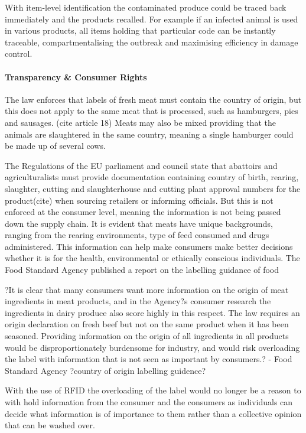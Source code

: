 \documentclass[a4paper, 11pt]{article}
\begin{document}
With item-level identification the contaminated produce could be traced back immediately and the products recalled. For example if an infected animal is used in various products, all items holding that particular code can be instantly traceable, compartmentalising the outbreak and maximising efficiency in damage control. 

\paragraph{Transparency \& Consumer Rights}
The law enforces that labels of fresh meat must contain the country of origin, but this does not apply to the same meat that is processed, such as hamburgers, pies and sausages. (cite article 18) Meats may also be mixed providing that the animals are slaughtered in the same country, meaning a single hamburger could be made up of several cows. 

The Regulations of the EU parliament and council state that abattoirs and agriculturalists must provide documentation containing country of birth, rearing, slaughter, cutting and slaughterhouse and cutting plant approval numbers for the product(cite) when sourcing retailers or informing officials. But this is not enforced at the consumer level, meaning the information is not being passed down the supply chain. It is evident that meats have unique backgrounds, ranging from the rearing environments, type of feed consumed and drugs administered. This information can help make consumers make better decisions whether it is for the health, environmental or ethically conscious individuals. The Food Standard Agency published a report on the labelling guidance of food 

?It is clear that many consumers want more information on the origin of meat ingredients in meat products, and in the Agency?s consumer research the ingredients in dairy produce also score highly in this respect. The law requires an origin declaration on fresh beef but not on the same product when it has been seasoned. Providing information on the origin of all ingredients in all products would be disproportionately burdensome for industry, and would risk overloading the label with information that is not
seen as important by consumers.? - Food Standard Agency ?country of origin labelling guidence?

With the use of RFID the overloading of the label would no longer be a reason to with hold information from the consumer and the consumers as individuals can decide what information is of importance to them rather than a collective opinion that can be washed over.
\end{document}
